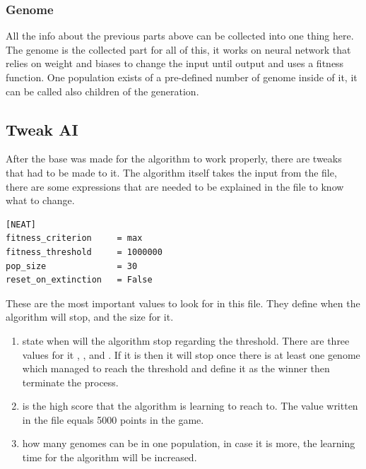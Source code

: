 \subsubsection{Genome}\label{sec:genome}
All the info about the previous parts above can be collected into one thing here. The genome is the collected part for all of this, it works on neural network that relies on weight and biases to change the input until output and uses a fitness function. One population exists of a pre-defined number of genome inside of it, it can be called also children of the generation.



\subsection{Tweak AI}\label{tweak-ai}

After the base was made for the algorithm to work properly, there are tweaks that had to be made to it. The algorithm itself takes the input from the  file, there are some expressions that are needed to be explained in the file to know what to change.

\begin{listing}[H]
\begin{verbatim}
[NEAT]
fitness_criterion     = max
fitness_threshold     = 1000000
pop_size              = 30
reset_on_extinction   = False
\end{verbatim}
\end{listing}

These are the most important values to look for in this file. They define when the algorithm will stop, and the size for it.

\begin{enumerate}
\item {} state when will the algorithm stop regarding the threshold. There are three values for it , , and . If it is  then it will stop once there is at least one genome which managed to reach the threshold and define it as the winner then terminate the process.

\item {} is the high score that the algorithm is learning to reach to. The value written in the file equals 5000 points in the game.

\item {} how many genomes can be in one population, in case it is more, the learning time for the algorithm will be increased.

\end{enumerate}

